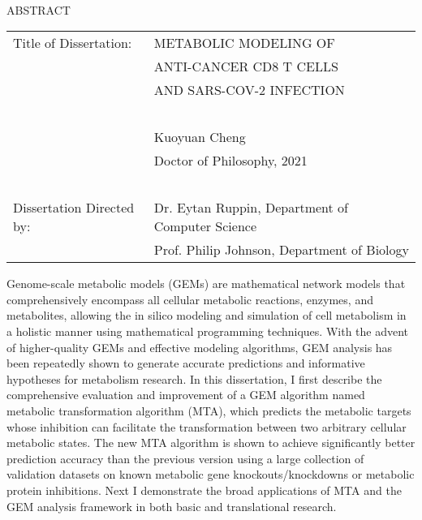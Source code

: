 \documentclass[12pt,twoside,openany,\mydriver]{thesis}  %
\renewcommand{\baselinestretch}{2}
\begin{document}
\pagestyle{empty} %
  \begin{abstract1}
    \hbox{\ }
    \renewcommand{\baselinestretch}{1} \small \normalsize
    \begin{center} \large{{ABSTRACT}}
    \vspace{3em}
    \end{center} \hspace{-.15in} \begin{tabular}{ll} Title of Dissertation:    & {\large  METABOLIC MODELING OF}\\ &                     {\large  ANTI-CANCER CD8 T CELLS} \\ &                     {\large  AND SARS-COV-2 INFECTION} \\ \ \\ &                          {\large  Kuoyuan Cheng} \\ &                           {\large Doctor of Philosophy, 2021} \\ \ \\ Dissertation Directed by: & {\large  Dr. Eytan Ruppin, Department of Computer Science} \\ &               {\large  Prof. Philip Johnson, Department of Biology} \\ \end{tabular}
    \vspace{3em}
    \renewcommand{\baselinestretch}{2} \large \normalsize
    
    Genome-scale metabolic models (GEMs) are mathematical network models that comprehensively encompass all cellular metabolic reactions, enzymes, and metabolites, allowing the in silico modeling and simulation of cell metabolism in a holistic manner using mathematical programming techniques. With the advent of higher-quality GEMs and effective modeling algorithms, GEM analysis has been repeatedly shown to generate accurate predictions and informative hypotheses for metabolism research. In this dissertation, I first describe the comprehensive evaluation and improvement of a GEM algorithm named metabolic transformation algorithm (MTA), which predicts the metabolic targets whose inhibition can facilitate the transformation between two arbitrary cellular metabolic states. The new MTA algorithm is shown to achieve significantly better prediction accuracy than the previous version using a large collection of validation datasets on known metabolic gene knockouts/knockdowns or metabolic protein inhibitions. Next I demonstrate the broad applications of MTA and the GEM analysis framework in both basic and translational research.
    

\end{abstract1}
\end{document}
